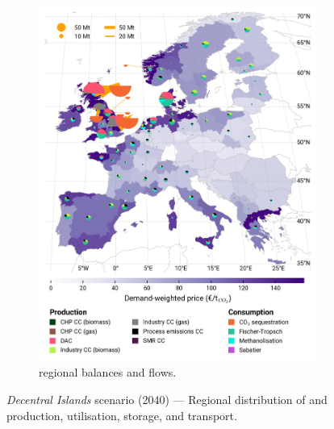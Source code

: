 \documentclass[preprint,12pt,sort&compress]{elsarticle}
\begin{document}
\begin{figure}[htbp]
\begin{subfigure}[t]{0.49\textwidth}
      \includegraphics[width=1\textwidth]{maps/no-pipelines-no-pcipmi/base_s_adm___2040-balance_map_co2_stored} 
      \vspace{-0.7cm}
      \caption{ regional balances and flows.}
      \label{fig:DI_lt_2040_co2}
  \end{subfigure}
  \caption{\textit{Decentral Islands} scenario (2040) --- Regional distribution of  and  production, utilisation, storage, and transport.}
  \label{fig:DI_lt_2040}
\end{figure}
\end{document}
